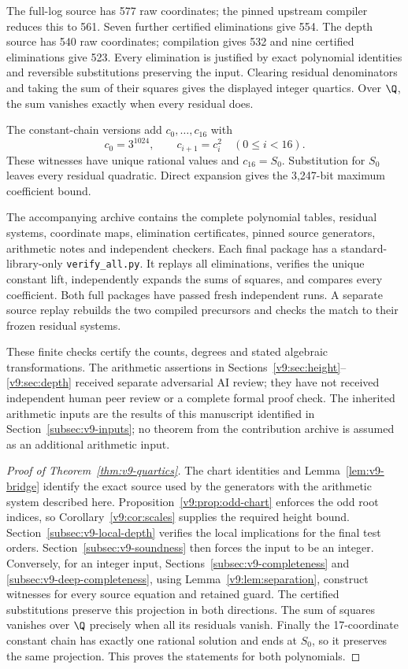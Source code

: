 The full-log source has 577 raw coordinates; the pinned upstream compiler reduces this to 561. Seven further certified eliminations give 554. The depth source has 540 raw coordinates; compilation gives 532 and nine certified eliminations give 523. Every elimination is justified by exact polynomial identities and reversible substitutions preserving the input. Clearing residual denominators and taking the sum of their squares gives the displayed integer quartics. Over $\Q$, the sum vanishes exactly when every residual does.

The constant-chain versions add $c_0,\ldots,c_{16}$ with
\[
 c_0=3^{1024},\qquad c_{i+1}=c_i^2\quad(0\le i<16).
\]
These witnesses have unique rational values and $c_{16}=S_0$. Substitution for $S_0$ leaves every residual quadratic. Direct expansion gives the 3,247-bit maximum coefficient bound.

The accompanying archive contains the complete polynomial tables, residual systems, coordinate maps, elimination certificates, pinned source generators, arithmetic notes and independent checkers. Each final package has a standard-library-only \texttt{verify\_all.py}. It replays all eliminations, verifies the unique constant lift, independently expands the sums of squares, and compares every coefficient. Both full packages have passed fresh independent runs. A separate source replay rebuilds the two compiled precursors and checks the match to their frozen residual systems.

These finite checks certify the counts, degrees and stated algebraic transformations. The arithmetic assertions in Sections~\ref{v9:sec:height}--\ref{v9:sec:depth} received separate adversarial AI review; they have not received independent human peer review or a complete formal proof check. The inherited arithmetic inputs are the results of this manuscript identified in Section~\ref{subsec:v9-inputs}; no theorem from the contribution archive is assumed as an additional arithmetic input.



\begin{proof}[Proof of Theorem~\ref{thm:v9-quartics}]
The chart identities and Lemma~\ref{lem:v9-bridge} identify the exact
source used by the generators with the arithmetic system described here.
Proposition~\ref{v9:prop:odd-chart} enforces the odd root indices, so
Corollary~\ref{v9:cor:scales} supplies the required height bound.
Section~\ref{subsec:v9-local-depth} verifies the local implications for
the final test orders. Section~\ref{subsec:v9-soundness} then forces
the input to be an integer. Conversely, for an integer input,
Sections~\ref{subsec:v9-completeness} and
\ref{subsec:v9-deep-completeness}, using Lemma~\ref{v9:lem:separation},
construct witnesses for every source equation and retained guard.
The certified substitutions preserve this projection in both directions.
The sum of squares vanishes over $\Q$ precisely when all its residuals
vanish. Finally the 17-coordinate constant chain has exactly one rational
solution and ends at $S_0$, so it preserves the same projection. This
proves the statements for both polynomials.
\end{proof}

